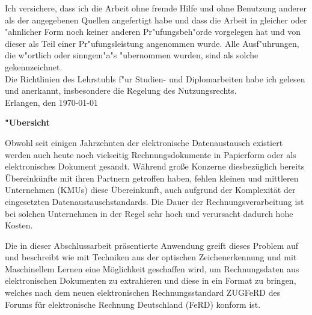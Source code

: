 \documentclass[english,mt]{lmedoc}
\begin{document}
\clearpage
  \begin{deckblatt}
  \end{deckblatt}

\cleardoublepage


Ich versichere, dass ich die Arbeit ohne fremde Hilfe und ohne Benutzung
anderer als der angegebenen Quellen angefertigt habe und dass die Arbeit
in gleicher oder "ahnlicher Form noch keiner anderen Pr"ufungsbeh"orde
vorgelegen hat und von dieser als Teil einer Pr"ufungsleistung
angenommen wurde. Alle Ausf"uhrungen, die w"ortlich oder sinngem"a"s
"ubernommen wurden, sind als solche gekennzeichnet.
\\

Die Richtlinien des Lehrstuhls f"ur Studien- und Diplomarbeiten
habe ich gelesen und anerkannt, insbesondere die Regelung des
Nutzungsrechts. \\[15mm]
Erlangen, den  \today \hspace{6.0cm} \\[10mm]


\cleardoublepage

\begin{center}
\bfseries
"Ubersicht
\normalfont

Obwohl seit einigen Jahrzehnten der elektronische Datenaustausch existiert werden auch heute noch vielseitig Rechnungsdokumente in Papierform oder als elektronisches Dokument gesandt. W\"ahrend gro{\ss}e Konzerne diesbez\"uglich bereits \"Ubereink\"unfte mit ihren Partnern getroffen haben, fehlen kleinen und mittleren Unternehmen (KMUs) diese \"Ubereinkunft, auch aufgrund der Komplexit\"at der eingesetzten Datenaustauschstandards.
Die Dauer der Rechnungsverarbeitung ist bei solchen Unternehmen in der Regel sehr hoch und verursacht dadurch hohe Kosten. 

Die in dieser Abschlussarbeit pr\"asentierte Anwendung greift dieses Problem auf und beschreibt wie mit Techniken aus der optischen Zeichenerkennung und mit Maschinellem Lernen eine M\"oglichkeit geschaffen wird, um Rechnungsdaten aus elektronischen Dokumenten zu extrahieren und diese in ein Format zu bringen, welches nach dem neuen elektronischen Rechnungsstandard ZUGFeRD des Forums f\"ur elektronische Rechnung Deutschland (FeRD) konform ist.

\end{center}
\end{document}
